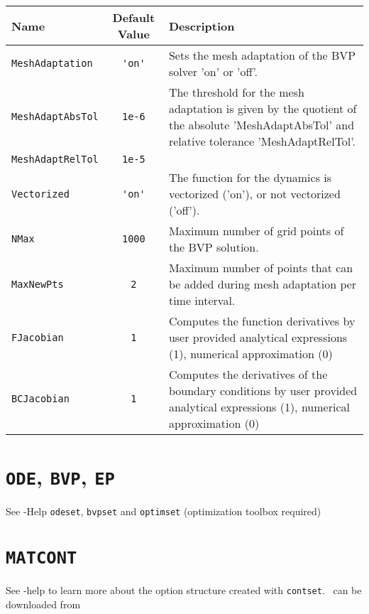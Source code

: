 \begin{tabularx}{\linewidth}{|l|c|X|}\hline
\textbf{Name} & \textbf{Default Value} & \textbf{Description}\\\hline
\lstinline+MeshAdaptation+ & \lstinline+'on'+ & Sets the mesh adaptation of the BVP solver 'on' or 'off'.\\ 
\lstinline+MeshAdaptAbsTol+ & \lstinline+1e-6+ & The threshold for the mesh adaptation is given by the quotient of the absolute 'MeshAdaptAbsTol' and relative tolerance 'MeshAdaptRelTol'.\\ 
\lstinline+MeshAdaptRelTol+ & \lstinline+1e-5+ & \\ 
\lstinline+Vectorized+ & \lstinline+'on'+ & The function for the dynamics is vectorized ('on'), or not vectorized ('off').\\ 
\lstinline+NMax+ & \lstinline+1000+ & Maximum number of grid points of the BVP solution.\\ 
\lstinline+MaxNewPts+ & \lstinline+2+ & Maximum number of points that can be added during mesh adaptation per time interval.\\ 
\lstinline+FJacobian+ & \lstinline+1+ & Computes the function derivatives by user provided analytical expressions (1), numerical approximation (0)\\ 
\lstinline+BCJacobian+ & \lstinline+1+ & Computes the derivatives of the boundary conditions by user provided analytical expressions (1), numerical approximation (0)\\ 
\hline
\end{tabularx}

\section{\texorpdfstring{\lstinline+ODE+, \lstinline+BVP+, \lstinline+EP+}{\ODE, \BVP, EP}}
\label{sec:options_opts_odebvpep}

See \MATL-Help \lstinline+odeset+, \lstinline+bvpset+ and \lstinline+optimset+ (optimization toolbox required)


\section{\texorpdfstring{\lstinline+MATCONT+}{MATCONT}}
\label{sec:options_opts_matcont}

See \MATCONT-help to learn more about the option structure created with \lstinline+contset+. \MATCONT\ can be downloaded from \httpMATCONT
